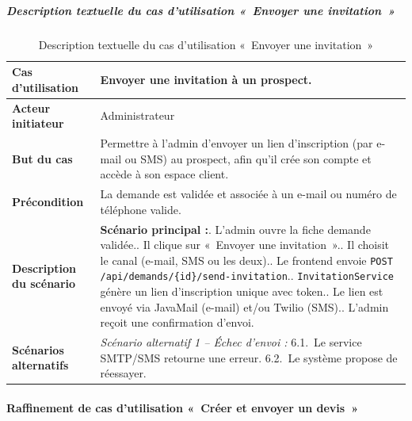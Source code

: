 \subparagraph{Description textuelle du cas d'utilisation «~Envoyer une invitation~»}

\begin{table}[H]
  \caption{Description textuelle du cas d'utilisation «~Envoyer une invitation~»}
  \label{tab:cu-invitation}
  \centering
  \begin{tabularx}{\textwidth}{|L{3.8cm}|X|}
    \hline
    \textbf{Cas d'utilisation} & Envoyer une invitation à un prospect. \\
    \hline
    \textbf{Acteur initiateur} & Administrateur \\
    \hline
    \textbf{But du cas} & Permettre à l'admin d'envoyer un lien d'inscription (par e-mail ou SMS) au prospect, afin qu'il crée son compte et accède à son espace client. \\
    \hline
    \textbf{Précondition} & La demande est validée et associée à un e-mail ou numéro de téléphone valide. \\
    \hline
    \textbf{Description du scénario} &
    \textbf{Scénario principal :}. L'admin ouvre la fiche demande validée.. Il clique sur «~Envoyer une invitation~».. Il choisit le canal (e-mail, SMS ou les deux).. Le frontend envoie \texttt{POST /api/demands/\{id\}/send-invitation}.. \texttt{InvitationService} génère un lien d'inscription unique avec token.. Le lien est envoyé via JavaMail (e-mail) et/ou Twilio (SMS).. L'admin reçoit une confirmation d'envoi.\\
    \hline
    \textbf{Scénarios alternatifs} &
    \textit{Scénario alternatif 1 -- Échec d'envoi :}\newline
    \hspace*{6pt}6.1.~Le service SMTP/SMS retourne une erreur.\newline
    \hspace*{6pt}6.2.~Le système propose de réessayer.\\
    \hline
  \end{tabularx}
\end{table}

\paragraph{Raffinement de cas d'utilisation «~Créer et envoyer un devis~»}

